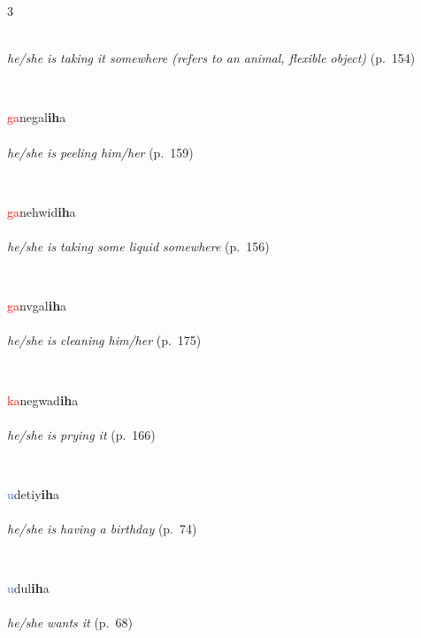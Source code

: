 \documentclass[oneside,openany]{book}%
\begin{document}
\begin{multicols}{3}
\begin{minipage}[t]{\linewidth}
\\
\noindent \textit{he/she is taking it somewhere (refers to an animal, flexible object)} (p.~154)
\end{minipage}\\[1em]%
\begin{minipage}[t]{\linewidth}
\raggedright\noindent \textcolor{Red}{ga}negal\textbf{ih}a\\
\\
\noindent \textit{he/she is peeling him/her} (p.~159)
\end{minipage}\\[1em]%
\begin{minipage}[t]{\linewidth}
\raggedright\noindent \textcolor{Red}{ga}nehwid\textbf{ih}a\\
\\
\noindent \textit{he/she is taking some liquid somewhere} (p.~156)
\end{minipage}\\[1em]%
\begin{minipage}[t]{\linewidth}
\raggedright\noindent \textcolor{Red}{ga}nvgal\textbf{ih}a\\
\\
\noindent \textit{he/she is cleaning him/her} (p.~175)
\end{minipage}\\[1em]%
\begin{minipage}[t]{\linewidth}
\raggedright\noindent \textcolor{Red}{ka}negwad\textbf{ih}a\\
\\
\noindent \textit{he/she is prying it} (p.~166)
\end{minipage}\\[1em]%
\begin{minipage}[t]{\linewidth}
\raggedright\noindent \textcolor{RoyalBlue}{u}detiy\textbf{ih}a\\
\\
\noindent \textit{he/she is having a birthday} (p.~74)
\end{minipage}\\[1em]%
\begin{minipage}[t]{\linewidth}
\raggedright\noindent \textcolor{RoyalBlue}{u}dul\textbf{ih}a\\
\\
\noindent \textit{he/she wants it} (p.~68)
\end{minipage}\\[1em]%
\end{multicols}%
\vspace{1em}%
\needspace{1.5in}%
\end{document}
